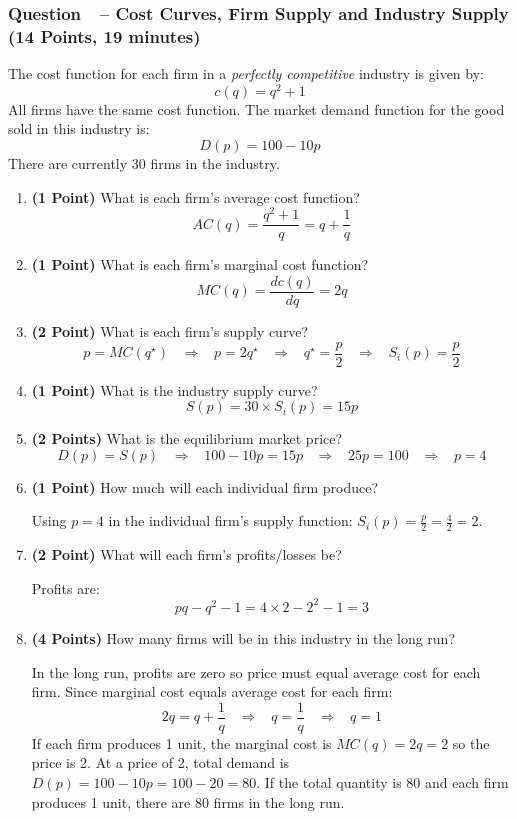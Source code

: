 \documentclass[11pt]{article}
\newcounter{question}[section]
\newcommand{\question}[1]{\refstepcounter{question}
  \subsubsection*{Question~\thequestion~-- #1}}
\newenvironment{subquestions}{
  \begin{enumerate}[label=(\roman*)]}{\end{enumerate}}
\begin{document}
\question{Cost Curves, Firm Supply and Industry Supply (14 Points, 19 minutes)}
The cost function for each firm in a \emph{perfectly competitive} industry is given by:
\[
  c\left( q \right)=q^2+1
\]
All firms have the same cost function. The market demand function for the good sold in this industry is:
\[
  D\left( p \right)=100-10p
\]
There are currently 30 firms in the industry.
\begin{subquestions}
  \item \textbf{(1 Point)} What is each firm's average cost function?
  \textcolor{solution-color}{
  \[ AC\left( q \right)=\frac{q^2+1}{q}=q+\frac{1}{q}\]
  }
  \item \textbf{(1 Point)} What is each firm's marginal cost function?
  \textcolor{solution-color}{
    \[ MC\left( q \right)=\frac{dc\left( q \right)}{dq}=2q\]
  }
  \item \textbf{(2 Point)} What is each firm's supply curve?
  \textcolor{solution-color}{
    \[ p=MC\left( q^\star \right)
    \;\;\;\Longrightarrow\;\;\;
    p=2q^\star
    \;\;\;\Longrightarrow\;\;\;
    q^\star = \frac{p}{2}
    \;\;\;\Longrightarrow\;\;\;
    S_i\left( p \right) = \frac{p}{2}
  \]
  }
  \item \textbf{(1 Point)} What is the industry supply curve?
  \textcolor{solution-color}{
    \[ S\left( p \right)= 30 \times S_i\left( p \right)=15p\]
  }
  \item \textbf{(2 Points)} What is the equilibrium market price?
  \textcolor{solution-color}{
    \[ D\left( p \right)=S\left( p \right)
    \;\;\;\Longrightarrow\;\;\;
    100-10p = 15p
    \;\;\;\Longrightarrow\;\;\;
    25p=100
    \;\;\;\Longrightarrow\;\;\;
    p=4
    \]
  }
  \item \textbf{(1 Point)} How much will each individual firm produce?

  \textcolor{solution-color}{
    Using $p=4$ in the individual firm's supply function: $S_i\left( p \right)=\frac{p}{2}=\frac{4}{2}=2$.
  }
  \item \textbf{(2 Point)} What will each firm's profits/losses be?

  \textcolor{solution-color}{
    Profits are:
    \[
      pq - q^2 - 1 = 4\times 2 - 2^2 - 1 = 3
    \]
  }
  \item \textbf{(4 Points)} How many firms will be in this industry in the long run?

  \textcolor{solution-color}{
    In the long run, profits are zero so price must equal average cost for each firm. Since marginal cost equals average cost for each firm:
    \[
      2q=q+\frac{1}{q}\;\;\;\Longrightarrow \;\;\;
      q=\frac{1}{q} \;\;\;\Longrightarrow \;\;\;
      q=1
    \]
    If each firm produces 1 unit, the marginal cost is $MC\left( q \right)=2q=2$ so the price is 2. At a price of 2, total demand is $D\left( p \right)=100-10p=100-20=80$. If the total quantity is 80 and each firm produces 1 unit, there are 80 firms in the long run.
  }
\end{subquestions}
\end{document}
